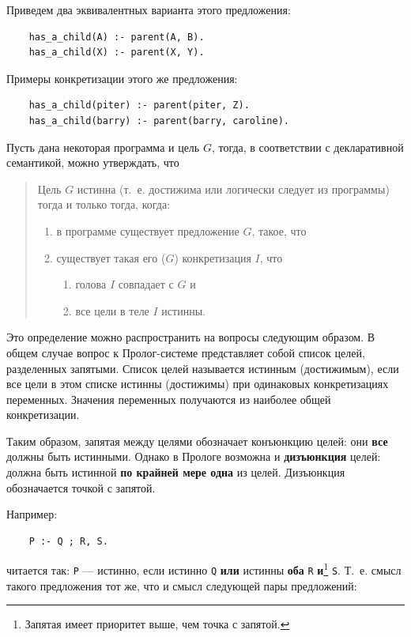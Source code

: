 \documentclass[12pt, openany, twoside]{book} %
\begin{document}
\noindent Приведем два эквивалентных варианта этого предложения:
{\tt\begin{verbatim}
    has_a_child(А) :- parent(А, В).
    has_a_child(X) :- parent(X, Y).
\end{verbatim}}

\noindent Примеры конкретизации этого же предложения:
{\tt\begin{verbatim}
    has_a_child(piter) :- parent(piter, Z).
    has_a_child(barry) :- parent(barry, caroline).
\end{verbatim}}

\noindent Пусть дана некоторая программа и цель $G$, тогда, в соответствии с декларативной семантикой, можно утверждать, что

\begin{quote}
\noindent Цель $G$ истинна (т.~е. достижима или логически следует из программы) тогда и только тогда, когда:
\begin{enumerate}
    \item[(1)] в программе существует предложение $G$, такое, что
    \item[(2)] существует такая его ($G$) конкретизация $I$, что
    \begin{enumerate}
        \item[(а)] голова $I$ совпадает с $G$ и
        \item[(б)] все цели в теле $I$ истинны.
    \end{enumerate}
\end{enumerate}
\end{quote}

Это определение можно распространить на вопросы следующим образом. В общем случае вопрос к Пролог-системе представляет собой список целей, разделенных запятыми. Список целей называется истинным (достижимым), если все цели в этом списке истинны (достижимы) при одинаковых конкретизациях переменных. Значения переменных получаются из наиболее общей конкретизации.

Таким образом, запятая между целями обозначает конъюнкцию целей: они \textbf{все} должны быть истинными. Однако в Прологе возможна и \textbf{дизъюнкция} целей: должна быть истинной \textbf{по крайней мере одна} из целей. Дизъюнкция обозначается точкой с запятой.

Например:
{\tt\begin{verbatim}
    Р :- Q ; R, S.
\end{verbatim}}
\noindent читается так: {\tt Р} --- истинно, если истинно {\tt Q} \textbf{или} истинны {\bf оба} {\tt R} {\bf и}\footnote{Запятая имеет приоритет выше, чем точка с запятой.} {\tt S}. Т.~е. смысл такого предложения тот же, что и смысл следующей пары предложений:
\end{document}
